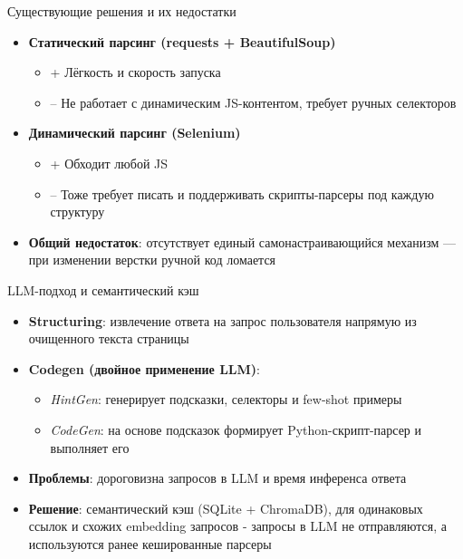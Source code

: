 \documentclass
  [ russian
  , aspectratio=1610 %
  ] {beamer}
\begin{document}
\begin{frame}{Существующие решения и их недостатки}
    \begin{itemize}
        \item \textbf{Статический парсинг (requests + BeautifulSoup)}
            \begin{itemize}
                \item + Лёгкость и скорость запуска
                \item – Не работает с динамическим JS-контентом, требует ручных селекторов
            \end{itemize}
        \item \textbf{Динамический парсинг (Selenium)}
            \begin{itemize}
                \item + Обходит любой JS
                \item – Тоже требует писать и поддерживать скрипты-парсеры под каждую структуру
            \end{itemize}
        \item \textbf{Общий недостаток}: отсутствует единый самонастраивающийся механизм — при изменении верстки ручной код ломается
    \end{itemize}
\end{frame}

\begin{frame}{LLM-подход и семантический кэш}
    \begin{itemize}
        \item \textbf{Structuring}: извлечение ответа на запрос пользователя напрямую из очищенного текста страницы
        \item \textbf{Codegen (двойное применение LLM)}:
            \begin{itemize}
                \item \emph{HintGen}: генерирует подсказки, селекторы и few-shot примеры
                \item \emph{CodeGen}: на основе подсказок формирует Python-скрипт-парсер и выполняет его
            \end{itemize}
        \item \textbf{Проблемы}: дороговизна запросов в LLM и время инференса ответа
        \item \textbf{Решение}: семантический кэш (SQLite + ChromaDB), для одинаковых ссылок и схожих embedding запросов - запросы в LLM не отправляются, а используются ранее кешированные парсеры
    \end{itemize}
\end{frame}
\end{document}
